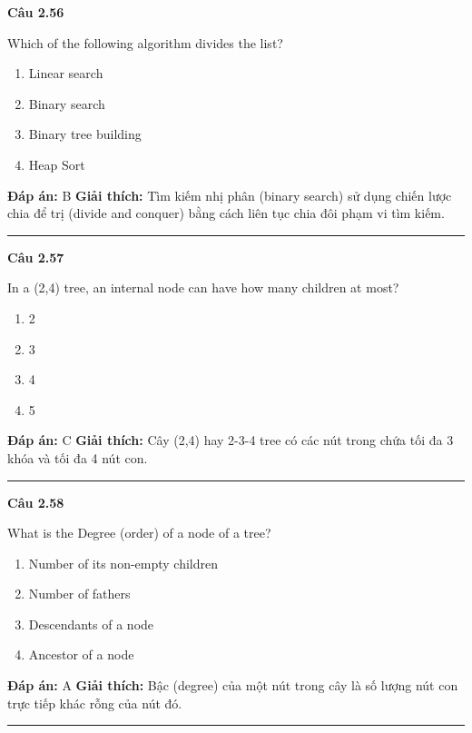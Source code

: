 \documentclass[11pt,a4paper]{article}
\newenvironment{question}[1]{%
  \par\vspace{1em}\noindent\textbf{\large Câu #1}\par\vspace{0.4em}
}{%
  \par\vspace{1em}\hrule\vspace{0.6em}
}
\newenvironment{choices}{%
  \begin{enumerate}[label=\textbf{\Alph*.},leftmargin=2.2em,itemsep=2pt,topsep=3pt]
}{%
  \end{enumerate}
}
\newcommand{\choice}{\item}
\begin{document}
\begin{question}{2.56}
Which of the following algorithm divides the list?
\begin{choices}
\choice Linear search
\choice Binary search
\choice Binary tree building
\choice Heap Sort
\end{choices}
\textbf{Đáp án:} B
\textbf{Giải thích:} Tìm kiếm nhị phân (binary search) sử dụng chiến lược chia để trị (divide and conquer) bằng cách liên tục chia đôi phạm vi tìm kiếm.
\end{question}

\begin{question}{2.57}
In a (2,4) tree, an internal node can have how many children at most?
\begin{choices}
\choice 2
\choice 3
\choice 4
\choice 5
\end{choices}
\textbf{Đáp án:} C
\textbf{Giải thích:} Cây (2,4) hay 2-3-4 tree có các nút trong chứa tối đa 3 khóa và tối đa 4 nút con.
\end{question}

\begin{question}{2.58}
What is the Degree (order) of a node of a tree?
\begin{choices}
\choice Number of its non-empty children
\choice Number of fathers
\choice Descendants of a node
\choice Ancestor of a node
\end{choices}
\textbf{Đáp án:} A
\textbf{Giải thích:} Bậc (degree) của một nút trong cây là số lượng nút con trực tiếp khác rỗng của nút đó.
\end{question}
\end{document}
